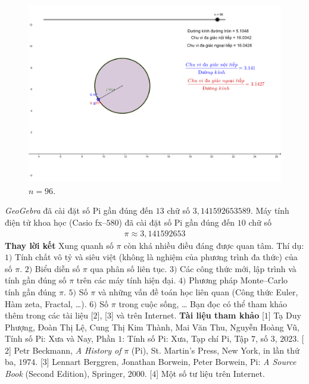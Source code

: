 \begin{multicols}{2}
	\begin{figure}[H]
		\vspace*{-5pt}
		\centering
		\captionsetup{labelformat= empty, justification=centering}
		\includegraphics[width= 1\linewidth]{16}
		\caption{\small\textit{\color{lichsutoanhoc}$n = 96$.}}
		\vspace*{-10pt}
	\end{figure}	
	\textit{GeoGebra} đã cài đặt số Pi gần đúng đến $13$ chữ số $3{,}141592653589$.
	\vskip 0.1cm  
	Máy tính điện tử khoa học (Casio fx--$580$) đã cài đặt số Pi gần đúng đến $10$ chữ số
	\begin{align*}
		\pi \approx 3{,}141592653
	\end{align*}
	\textbf{\color{lichsutoanhoc}Thay lời kết}
	\vskip 0.1cm
	Xung quanh số $\pi$  còn khá nhiều điều đáng được quan tâm. Thí dụ:
	\vskip 0.1cm
	$1)$ Tính chất vô tỷ và siêu việt (không là nghiệm của phương trình đa thức) của số $\pi$.
	\vskip 0.1cm  
	$2)$ Biểu diễn số  $\pi$ qua phân số liên tục.
	\vskip 0.1cm
	$3)$ Các công thức mới, lập trình và tính gần đúng số $\pi$  trên các máy tính hiện đại. 
	\vskip 0.1cm
	$4)$ Phương pháp Monte--Carlo tính gần đúng $\pi$.
	\vskip 0.1cm   
	$5)$ Số $\pi$ và những vấn đề toán học liên quan (Công thức Euler, Hàm zeta, Fractal, \ldots).
	\vskip 0.1cm
	$6)$ Số $\pi$ trong cuộc sống, \ldots 
	\vskip 0.1cm
	Bạn đọc có thể tham khảo thêm trong các tài liệu [$2$], [$3$]  và trên Internet. 
	\vskip 0.1cm
	\textbf{\color{lichsutoanhoc}Tài liệu tham khảo}
	\vskip 0.1cm
	[$1$] Tạ Duy Phượng, Đoàn Thị Lệ, Cung Thị Kim Thành, Mai Văn Thu, Nguyễn Hoàng Vũ, Tính số Pi: Xưa và Nay, Phần $1$: Tính số Pi: Xưa, Tạp chí Pi, Tập $7$, số $3$, $2023$.
	\vskip 0.1cm
	[$2$] Petr Beckmann, \textit{A History of} $\pi$ (Pi), St. Martin's Press, New York, in lần thứ ba, $1974$.
	\vskip 0.1cm 
	[$3$] Lennart Berggren, Jonathan Borwein, Peter Borwein, Pi: \textit{A Source Book} (Second Edition), Springer, $2000$.
	\vskip 0.1cm 
	[$4$] Một số tư liệu trên Internet.
\end{multicols}